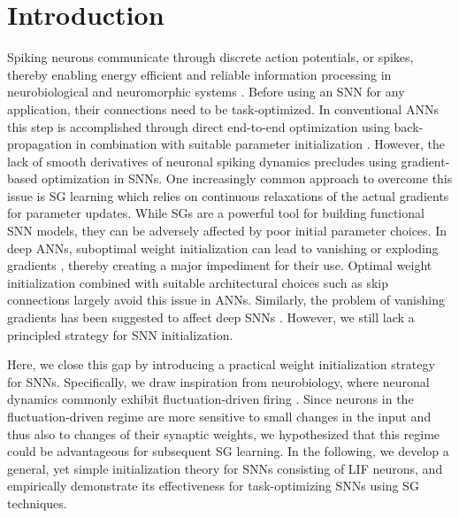 \documentclass[11pt,a4paper]{article}
\begin{document}
\section*{Introduction}
Spiking neurons communicate through discrete action potentials, or spikes, thereby enabling energy efficient and reliable information processing in neurobiological and neuromorphic systems \citep{sterling_principles_2017, indiveri_neuromorphic_2011}.
Before using an \ac{SNN} for any application, their connections need to be task-optimized. 
In conventional \acp{ANN} this step is accomplished through direct end-to-end optimization using back-propagation in combination with suitable parameter initialization \citep{poole_exponential_2016}.
However, the lack of smooth derivatives of neuronal spiking dynamics precludes using gradient-based optimization in \acp{SNN}.
One increasingly common approach to overcome this issue is \ac{SG} learning \citep{Hunsberger2015-kf,Zenke2021-zg, Neftci2019-ie} which relies on continuous relaxations of the actual gradients for parameter updates.  
While \acp{SG} are a powerful tool for building functional \ac{SNN} models, they can be adversely affected by poor initial parameter choices. 
In deep \acp{ANN}, suboptimal weight initialization can lead to vanishing or exploding gradients \citep{Hochreiter1991-uo,Hochreiter1997-hj}, thereby creating a major impediment for their use. 
Optimal weight initialization \citep{Glorot2010-dj, He2015-kv, Mishkin2015-zd} combined with suitable architectural choices such as skip connections \citep{Srivastava2015-yw,He2015-kv} largely avoid this issue in \acp{ANN}.
Similarly, the problem of vanishing gradients has been suggested to affect deep \acp{SNN} \citep{Lee2016,Ledinauskas2020-jk}.
However, we still lack a principled strategy for \ac{SNN} initialization. 


Here, we close this gap by introducing a practical weight initialization strategy for \acp{SNN}. 
Specifically, we draw inspiration from neurobiology, where neuronal dynamics commonly exhibit fluctuation-driven firing \citep{Tiesinga2000-fc, Kuhn2004-yi}. 
Since neurons in the fluctuation-driven regime are more sensitive to small changes in the input \citep{Petersen2016-kg} and thus also to changes of their synaptic weights, we hypothesized that this regime could be advantageous for subsequent \ac{SG} learning. 
In the following, we develop a general, yet simple initialization theory for \acp{SNN} consisting of \ac{LIF} neurons, and empirically demonstrate its effectiveness for task-optimizing \acp{SNN} using \ac{SG} techniques. 
\end{document}
